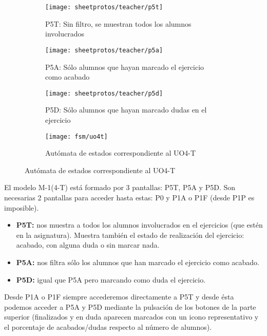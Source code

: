 \begin{figure}[H]
\begin{subfigure}[b]{0.3\textwidth}
	\texttt{[image: sheetprotos/teacher/p5t]}
	\caption{P5T: Sin filtro, se muestran todos los alumnos involucrados}
	\label{fig:analisis-de-requisitos:funcionales:uo4t:p5t}
\end{subfigure}
%
\begin{subfigure}[b]{0.3\textwidth}
	\texttt{[image: sheetprotos/teacher/p5a]}
	\caption{P5A: Sólo alumnos que hayan marcado el ejercicio como acabado}
	\label{fig:analisis-de-requisitos:funcionales:uo4t:p5a}
\end{subfigure}
%
\begin{subfigure}[b]{0.3\textwidth}
	\texttt{[image: sheetprotos/teacher/p5d]}
	\caption{P5D: Sólo alumnos que hayan marcado dudas en el ejercicio}
	\label{figanalisis-de-requisitos:funcionales:uo4t::p5d}
\end{subfigure}

\begin{subfigure}[b]{\textwidth}
	\centering
	\texttt{[image: fsm/uo4t]}
	\caption{Autómata de estados correspondiente al UO4-T}
	\label{fig:analisis-de-requisitos:funcionales:uo4t:fsm}
\end{subfigure}

\label{fig:analisis-de-requisitos:funcionales:uo4t:p5}
\end{figure}

El modelo M-1(4-T) está formado por 3 pantallas: P5T, P5A y P5D. Son necesarias 2 pantallas para acceder hasta estas: P0 y P1A o P1F (desde P1P es imposible).\\

\begin{itemize}
\item \textbf{P5T:} nos muestra a todos los alumnos involucrados en el ejercicios (que estén en la asignatura). Muestra también el estado de realización del ejercicio: acabado, con alguna duda o sin marcar nada.
\item \textbf{P5A:} nos filtra sólo los alumnos que han marcado el ejercicio como acabado.
\item \textbf{P5D:} igual que P5A pero marcando como duda el ejercicio.
\end{itemize}

Desde P1A o P1F siempre accederemos directamente a P5T y desde ésta podemos acceder a P5A y P5D mediante la pulsación de los botones de la parte superior (finalizados y en duda aparecen marcados con un icono representativo y el porcentaje de acabados/dudas respecto al número de alumnos).\\

